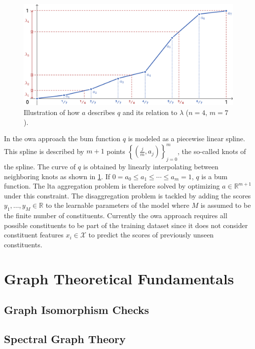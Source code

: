 \begin{figure}[h]
	\centering
	\includegraphics[width=0.75\linewidth]{gfx/related-work/bum.pdf}
	\caption[Illustration of how a \ac{bum} function is described as a linear spline and its relation to the \ac{owa} weights.]{
		Illustration of how \textcolor{t_blue}{$a$} describes \textcolor{t_blue}{$q$} and its relation to \textcolor{t_red}{$\lambda$} ($n = 4$, $m = 7$).
	}\label{fig:related:bum}
\end{figure}
In the \ac{owa} approach the \ac{bum} function $q$ is modeled as a piecewise linear spline.
This spline is described by $m+1$ points ${\left\{ \left( \frac{j}{m}, a_j \right) \right\}}_{j = 0}^{m}$, the so-called knots of the spline. %
The curve of $q$ is obtained by linearly interpolating between neighboring knots as shown in \cref{fig:related:bum}.
If $0 = a_0 \leq a_1 \leq \cdots \leq a_m = 1$, $q$ is a \ac{bum} function.
The \ac{lta} aggregation problem is therefore solved by optimizing $a \in \mathbb{R}^{m + 1}$ under this constraint.
The disaggregation problem is tackled by adding the scores $y_1, \dots, y_M \in \mathbb{R}$ to the learnable parameters of the model where $M$ is assumed to be the finite number of constituents.
Currently the \ac{owa} approach requires all possible constituents to be part of the training dataset since it does not consider constituent features $x_i \in \mathcal{X}$ to predict the scores of previously unseen constituents.

\section{Graph Theoretical Fundamentals}%
\label{sec:related:theory}

\subsection{Graph Isomorphism Checks}%
\label{sec:related:theory:wl}

\subsection{Spectral Graph Theory}%
\label{sec:related:theory:spectral}

